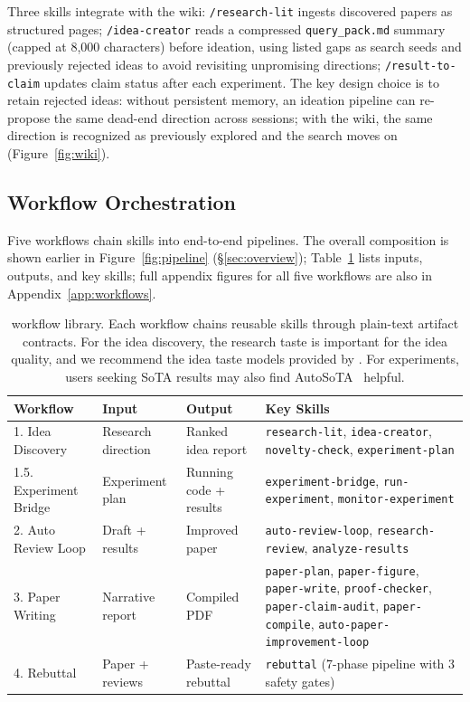 Three skills integrate with the wiki:
\texttt{/research-lit} ingests discovered papers as structured pages;
\texttt{/idea-creator} reads a compressed \texttt{query\_pack.md} summary (capped at 8{,}000 characters) before ideation, using listed gaps as search seeds and previously rejected ideas to avoid revisiting unpromising directions;
\texttt{/result-to-claim} updates claim status after each experiment.
The key design choice is to retain rejected ideas: without persistent memory, an ideation pipeline can re-propose the same dead-end direction across sessions; with the wiki, the same direction is recognized as previously explored and the search moves on (Figure~\ref{fig:wiki}).



\subsection{Workflow Orchestration}
\label{sec:workflows}

Five workflows chain skills into end-to-end pipelines.
The overall composition is shown earlier in Figure~\ref{fig:pipeline} (\S\ref{sec:overview}); Table~\ref{tab:workflows} lists inputs, outputs, and key skills; full appendix figures for all five workflows are also in Appendix~\ref{app:workflows}.

\begin{table}[t]
\centering
\caption{\aris{} workflow library. Each workflow chains reusable skills through plain-text artifact contracts. For the idea discovery, the research taste is important for the idea quality, and we recommend the idea taste models provided by \citet{tong2026aitaste}. For experiments, users seeking SoTA results may also find AutoSoTA~\citep{li2026autosota} helpful.}
\label{tab:workflows}
\footnotesize
\begin{tabular}{@{}p{2.6cm}p{2.3cm}p{2.6cm}p{5.5cm}@{}}
\toprule
\textbf{Workflow} & \textbf{Input} & \textbf{Output} & \textbf{Key Skills} \\
\midrule
1. Idea Discovery & Research direction & Ranked idea report & \texttt{research-lit}, \texttt{idea-creator}, \texttt{novelty-check}, \texttt{experiment-plan} \\
1.5. Experiment Bridge & Experiment plan & Running code + results & \texttt{experiment-bridge}, \texttt{run-experiment}, \texttt{monitor-experiment} \\
2. Auto Review Loop & Draft + results & Improved paper & \texttt{auto-review-loop}, \texttt{research-review}, \texttt{analyze-results} \\
3. Paper Writing & Narrative report & Compiled PDF & \texttt{paper-plan}, \texttt{paper-figure}, \texttt{paper-write}, \texttt{proof-checker}, \texttt{paper-claim-audit}, \texttt{paper-compile}, \texttt{auto-paper-improvement-loop} \\
4. Rebuttal & Paper + reviews & Paste-ready rebuttal & \texttt{rebuttal} (7-phase pipeline with 3 safety gates) \\
\bottomrule
\end{tabular}
\end{table}

